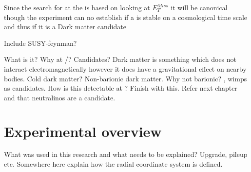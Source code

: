 Since the search for \abbrWIMPS at the \abbrLHC is based on looking at $E_T^{Miss}$ it will be canonical though the experiment can no establish if a \abbrWIMP is stable on a cosmological time scale and thus if it is a Dark matter candidate \citep{CERN-PH-EP-2012-210}

Include SUSY-feynman?

What is it? Why at \abbrCERN/\abbrATLAS? Candidates?
Dark matter is something which does not interact electromagnetically however it does have a gravitational effect on nearby bodies.
Cold dark matter?
Non-barionic dark matter. Why not barionic?
\abbrWIMPS, wimps as candidates.
How is this detectable at \abbrATLAS? Finish with this. Refer next chapter and that neutralinos are a candidate.

\newpage
\section{Experimental overview}\label{sec:experiment}
What was used in this research and what needs to be explained? Upgrade, pileup etc.
Somewhere here explain how the radial coordinate system is defined.
